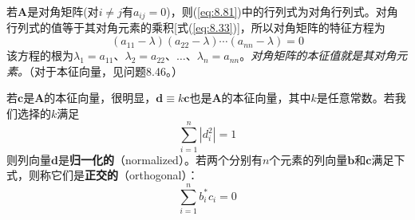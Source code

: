     若$\mathbf{A}$是对角矩阵(对$i \neq j$有$a_{ij} = 0$)，则(\ref{eq:8.81})中的行列式为对角行列式。对角行列式的值等于其对角元素的乘积[式(\ref{eq:8.33})]，所以对角矩阵的特征方程为
    \begin{equation*}
        \left(a_{11} - \lambda\right)\left(a_{22} - \lambda\right)\cdots\left(a_{nn} - \lambda\right) = 0
    \end{equation*}
    该方程的根为$\lambda_1 = a_{11}$、$\lambda_2 = a_{22}$、$\ldots$、$\lambda_n = a_{nn}$。\textit{对角矩阵的本征值就是其对角元素。}（对于本征向量，见问题8.46。）

    若$\mathbf{c}$是$\mathbf{A}$的本征向量，很明显，$\mathbf{d} \equiv k\mathbf{c}$也是$\mathbf{A}$的本征向量，其中$k$是任意常数。若我们选择的$k$满足
    \begin{equation}
        \boxed{
            \sum_{i=1}^{n} \left|d_i^2\right| = 1
        }
        \label{eq:8.83}
    \end{equation}
    则列向量$\mathbf{d}$是\textbf{归一化的}（normalized）。若两个分别有$n$个元素的列向量$\mathbf{b}$和$\mathbf{c}$满足下式，则称它们是\textbf{正交的}（orthogonal）：
    \begin{equation}
        \boxed{
            \sum_{i=1}^{n} b_i^{\ast}c_i = 0
        }
        \label{eq:8.84}
    \end{equation}

